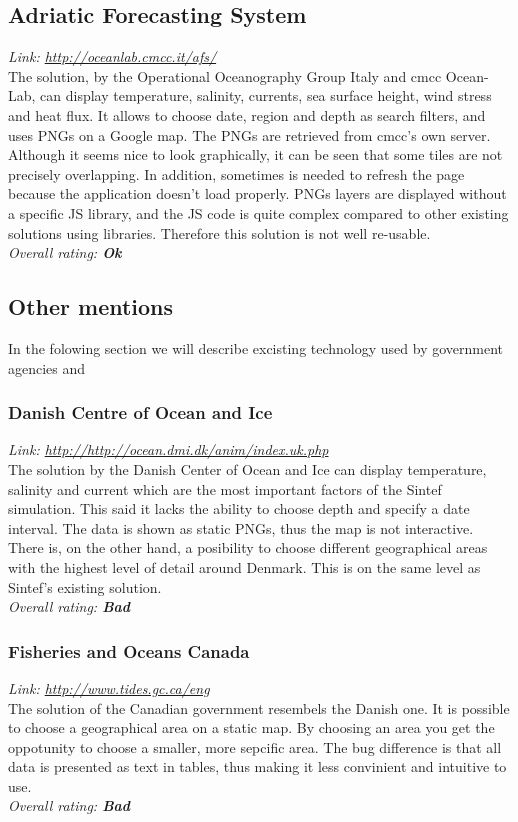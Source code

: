 \documentclass[11pt,a4paper,titlepage,oneside]{report}
\begin{document}
\subsection{Adriatic Forecasting System}
\emph{Link: \url{http://oceanlab.cmcc.it/afs/}} \\%
  The solution, by the Operational Oceanography Group Italy and cmcc Ocean-Lab, can display temperature, salinity, currents, sea surface height, wind stress and heat flux. It allows to choose date, region and depth as search filters, and uses PNGs on a Google map. The PNGs are retrieved from cmcc's own server.
  Although it seems nice to look graphically, it can be seen that some tiles are not precisely overlapping. In addition, sometimes is needed to refresh the page because the application doesn't load properly. PNGs layers are displayed without a specific JS library, and the JS code is quite complex compared to other existing solutions using libraries. Therefore this solution is not well re-usable.
\\ \emph{Overall rating: \textbf{Ok}}

\subsection{Other mentions}
In the folowing section we will describe excisting technology used by government agencies and
\subsubsection{Danish Centre of Ocean and Ice}
\emph{Link: \url{http://http://ocean.dmi.dk/anim/index.uk.php }} \\%
  The solution by the Danish Center of Ocean and Ice can display temperature, salinity and current which are the most important factors of the Sintef simulation. This said it lacks the ability to choose depth and specify a date interval. The data is shown as static PNGs, thus the map is not interactive. There is, on the other hand, a posibility to choose different geographical areas with the highest level of detail around Denmark. This is on the same level as Sintef's existing solution.
\\ \emph{Overall rating: \textbf{Bad}}

\subsubsection{Fisheries and Oceans Canada}
\emph{Link: \url{http://www.tides.gc.ca/eng}} \\%
  The solution of the Canadian government resembels the Danish one. It is possible to choose a geographical area on a static map. By choosing an area you get the oppotunity to choose a smaller, more sepcific area. The bug difference is that all data is presented as text in tables, thus making it less convinient and intuitive to use.
\\ \emph{Overall rating: \textbf{Bad}}
\end{document}
